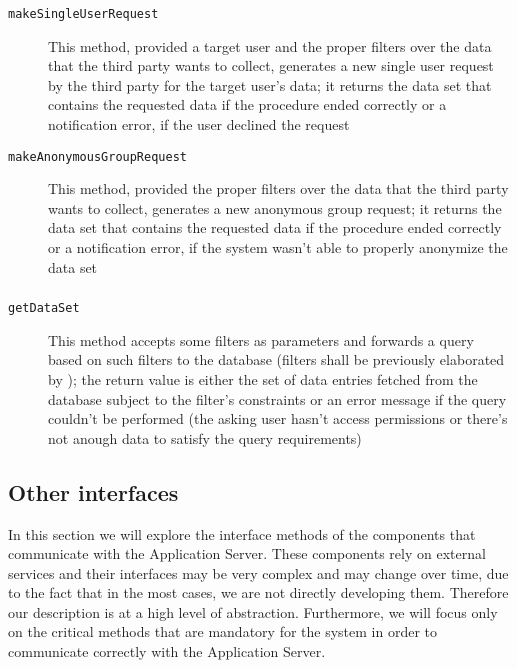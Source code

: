 \documentclass[../DD0.tex]{subfiles}
\begin{document}
    \subsubsection{\RequestManager}

      \begin{description}
        \item[\texttt{makeSingleUserRequest}] This method, provided a target user and the proper filters over the data that the third party wants to collect, generates a new single user request by the third party for the target user's data; it returns the data set that contains the requested data if the procedure ended correctly or a notification error, if the user declined the request
        \item[\texttt{makeAnonymousGroupRequest}] This method, provided the proper filters over the data that the third party wants to collect, generates a new anonymous group request; it returns the data set that contains the requested data if the procedure ended correctly or a notification error, if the system wasn't able to properly anonymize the data set
      \end{description}

    \subsubsection{\SetBuilder}

      \begin{description}
        \item[\texttt{getDataSet}] This method accepts some filters as parameters and forwards a query based on such filters to the database (filters shall be previously elaborated by \FilterManager); the return value is either the set of data entries fetched from the database subject to the filter's constraints or an error message if the query couldn't be performed (the asking user hasn't access permissions or there's not anough data to satisfy the query requirements)
      \end{description}

  \subsection{Other interfaces}
  \label{sec:otherinterfaces}

    In this section we will explore the interface methods of the components that communicate with the Application Server. These components rely on external services and their interfaces may be very complex and may change over time, due to the fact that in the most cases, we are not directly developing them. Therefore our description is at a high level of abstraction. Furthermore, we will focus only on the critical methods that are mandatory for the system in order to communicate correctly with the Application Server.
\end{document}
